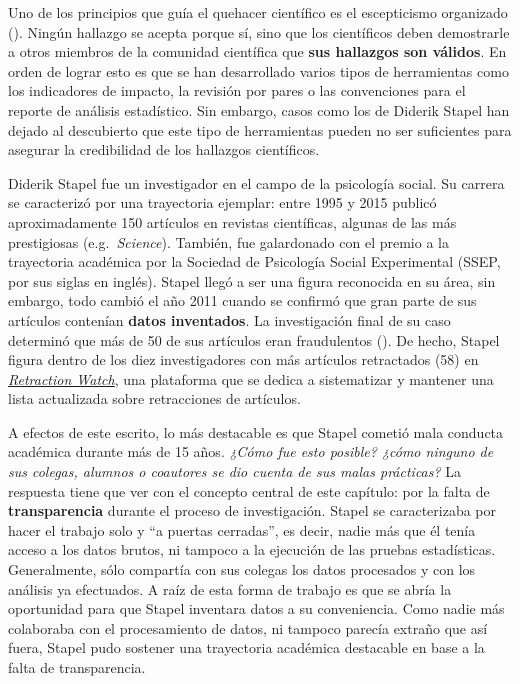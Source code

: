 \documentclass[
  spanish,
  a4paper,
  oneside]{scrbook}
\begin{document}
Uno de los principios que guía el quehacer científico es el escepticismo
organizado (). Ningún
hallazgo se acepta porque sí, sino que los científicos deben demostrarle
a otros miembros de la comunidad científica que \textbf{sus hallazgos
son válidos}. En orden de lograr esto es que se han desarrollado varios
tipos de herramientas como los indicadores de impacto, la revisión por
pares o las convenciones para el reporte de análisis estadístico. Sin
embargo, casos como los de Diderik Stapel han dejado al descubierto que
este tipo de herramientas pueden no ser suficientes para asegurar la
credibilidad de los hallazgos científicos.

Diderik Stapel fue un investigador en el campo de la psicología social.
Su carrera se caracterizó por una trayectoria ejemplar: entre 1995 y
2015 publicó aproximadamente 150 artículos en revistas científicas,
algunas de las más prestigiosas (e.g.~\emph{Science}). También, fue
galardonado con el premio a la trayectoria académica por la Sociedad de
Psicología Social Experimental (SSEP, por sus siglas en inglés). Stapel
llegó a ser una figura reconocida en su área, sin embargo, todo cambió
el año 2011 cuando se confirmó que gran parte de sus artículos contenían
\textbf{datos inventados}. La investigación final de su caso determinó
que más de 50 de sus artículos eran fraudulentos
(). De hecho, Stapel figura
dentro de los diez investigadores con más artículos retractados (58) en
\href{https://retractionwatch.com/}{\emph{Retraction Watch}}, una
plataforma que se dedica a sistematizar y mantener una lista actualizada
sobre retracciones de artículos.

A efectos de este escrito, lo más destacable es que Stapel cometió mala
conducta académica durante más de 15 años. \emph{¿Cómo fue esto posible?
¿cómo ninguno de sus colegas, alumnos o coautores se dio cuenta de sus
malas prácticas?} La respuesta tiene que ver con el concepto central de
este capítulo: por la falta de \textbf{transparencia} durante el proceso
de investigación. Stapel se caracterizaba por hacer el trabajo solo y
``a puertas cerradas'', es decir, nadie más que él tenía acceso a los
datos brutos, ni tampoco a la ejecución de las pruebas estadísticas.
Generalmente, sólo compartía con sus colegas los datos procesados y con
los análisis ya efectuados. A raíz de esta forma de trabajo es que se
abría la oportunidad para que Stapel inventara datos a su conveniencia.
Como nadie más colaboraba con el procesamiento de datos, ni tampoco
parecía extraño que así fuera, Stapel pudo sostener una trayectoria
académica destacable en base a la falta de transparencia.
\end{document}
